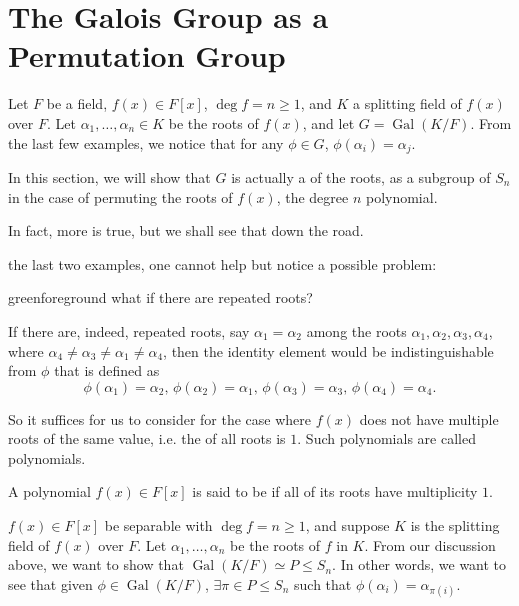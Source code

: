 \documentclass[notoc,notitlepage,nobib]{tufte-book}
\DeclareMathOperator{\Gal}{Gal}
\begin{document}

\section{The Galois Group as a Permutation Group}%
\label{sec:the_galois_group_as_a_permutation_group}

Let $F$ be a field, $f(x) \in F[x]$, $\deg f = n \geq 1$, and $K$ a splitting
field of $f(x)$ over $F$. Let $\alpha_1, \ldots, \alpha_n \in K$ be the roots of
$f(x)$, and let $G = \Gal(K / F)$. From the last few examples, we notice that
for any $\phi \in G$, $\phi(\alpha_i) = \alpha_j$.

In this section, we will show that $G$ is actually a 
of the roots, as a subgroup of $S_n$ in the case of permuting the roots of
$f(x)$, the degree $n$ polynomial.

In fact, more is true, but we shall see that down the road.

 the last two examples, one cannot help but notice a possible
problem:
\begin{quotebox}{green}{foreground}
  what if there are repeated roots?
\end{quotebox}
If there are, indeed, repeated roots, say $\alpha_1 = \alpha_2$ among the roots
$\alpha_1, \alpha_2, \alpha_3, \alpha_4$, where $\alpha_4 \neq \alpha_3 \neq
\alpha_1 \neq \alpha_4$, then the identity element would be indistinguishable
from $\phi$ that is defined as
\begin{equation*}
  \phi(\alpha_1) = \alpha_2, \, \phi(\alpha_2) = \alpha_1, \, \phi(\alpha_3) =
  \alpha_3, \, \phi(\alpha_4) = \alpha_4.
\end{equation*}

So it suffices for us to consider for the case where $f(x)$ does not have
multiple roots of the same value, i.e. the  of all roots
is $1$.  Such polynomials are called  polynomials.

\begin{defn}\label{defn:separable_polynomials}
  A polynomial $f(x) \in F[x]$ is said to be  if all of its
  roots have multiplicity $1$.
\end{defn}

 $f(x) \in F[x]$ be separable with $\deg f = n \geq 1$, and
suppose $K$ is the splitting field of $f(x)$ over $F$. Let $\alpha_1, \ldots,
\alpha_n$ be the roots of $f$ in $K$. From our discussion above, we want to show
that $\Gal(K / F) \simeq P \leq S_n$. In other words, we want to see that given
$\phi \in \Gal(K / F)$, $\exists \pi \in P \leq S_n$ such that $\phi(\alpha_i) =
\alpha_{\pi(i)}$.
\end{document}
